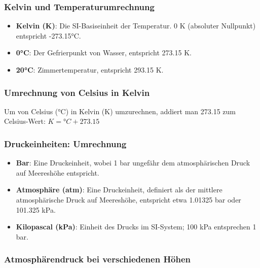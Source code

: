 \documentclass{vorlage-design-main}
\begin{document}
\hypertarget{kelvin-und-temperaturumrechnung}{%
\subsubsection{Kelvin und
Temperaturumrechnung}\label{kelvin-und-temperaturumrechnung}}

\begin{itemize}

\item
  \textbf{Kelvin (K)}: Die SI-Basiseinheit der Temperatur. 0 K
  (absoluter Nullpunkt) entspricht -273.15°C.
\item
  \textbf{0°C}: Der Gefrierpunkt von Wasser, entspricht 273.15 K.
\item
  \textbf{20°C}: Zimmertemperatur, entspricht 293.15 K.
\end{itemize}

\hypertarget{umrechnung-von-celsius-in-kelvin}{%
\subsubsection{Umrechnung von Celsius in
Kelvin}\label{umrechnung-von-celsius-in-kelvin}}

Um von Celsius (°C) in Kelvin (K) umzurechnen, addiert man 273.15 zum
Celsius-Wert: $K = °C + 273.15$

\hypertarget{druckeinheiten-umrechnung}{%
\subsubsection{Druckeinheiten:
Umrechnung}\label{druckeinheiten-umrechnung}}

\begin{itemize}

\item
  \textbf{Bar}: Eine Druckeinheit, wobei 1 bar ungefähr dem
  atmosphärischen Druck auf Meereshöhe entspricht.
\item
  \textbf{Atmosphäre (atm)}: Eine Druckeinheit, definiert als der
  mittlere atmosphärische Druck auf Meereshöhe, entspricht etwa 1.01325
  bar oder 101.325 kPa.
\item
  \textbf{Kilopascal (kPa)}: Einheit des Drucks im SI-System; 100 kPa
  entsprechen 1 bar.
\end{itemize}

\hypertarget{atmosphuxe4rendruck-bei-verschiedenen-huxf6hen}{%
\subsubsection{Atmosphärendruck bei verschiedenen
Höhen}\label{atmosphaerendruck-bei-verschiedenen-hoehen}}
\end{document}
